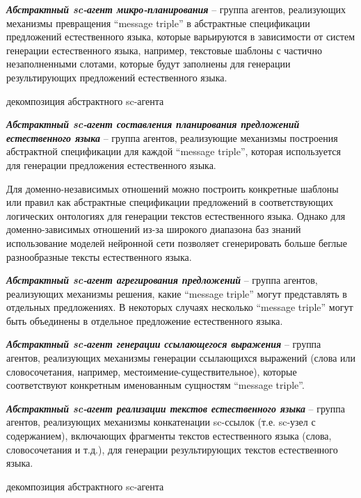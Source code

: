 \textit{\textbf{Абстрактный sc-агент микро-планирования}} -- группа агентов, реализующих механизмы превращения ``message triple'' в абстрактные спецификации предложений естественного языка, которые варьируются в зависимости от систем генерации естественного языка, например, текстовые шаблоны с частично незаполненными слотами, которые будут заполнены для генерации результирующих предложений естественного языка.
\begin{SCn}
	\begin{scnrelfromset}{декомпозиция абстрактного sc-агента}
	\end{scnrelfromset}
\end{SCn}

\textit{\textbf{Абстрактный sc-агент составления планирования предложений естественного языка}} -- группа агентов, реализующие механизмы построения абстрактной спецификации для каждой ``message triple'', которая используется для генерации предложения естественного языка.

Для доменно-независимых отношений можно построить конкретные шаблоны или правил как абстрактные спецификации предложений в соответствующих логических онтологиях для генерации текстов естественного языка. Однако для доменно-зависимых отношений из-за широкого диапазона баз знаний использование моделей нейронной сети позволяет сгенерировать больше беглые разнообразные тексты естественного языка. 

\textit{\textbf{Абстрактный sc-агент агрегирования предложений}} -- группа агентов, реализующих механизмы решения, какие ``message triple'' могут представлять в отдельных предложениях. В некоторых случаях несколько ``message triple'' могут быть объединены в отдельное предложение естественного языка.

\textit{\textbf{Абстрактный sc-агент генерации ссылающегося выражения}} -- группа агентов, реализующих механизмы генерации ссылающихся выражений (слова или словосочетания, например, местоимение-существительное), которые соответствуют конкретным именованным сущностям ``message triple''.

\textit{\textbf{Абстрактный sc-агент реализации текстов естественного языка}} -- группа агентов, реализующих механизмы конкатенации sc-ссылок (т.е. sc-узел с содержанием), включающих фрагменты текстов естественного языка (слова, словосочетания и т.д.), для генерации результирующих текстов естественного языка. 
\begin{SCn}
	\begin{scnrelfromset}{декомпозиция абстрактного sc-агента}
	\end{scnrelfromset}
\end{SCn}

